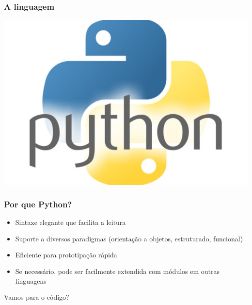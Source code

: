 \documentclass[aspectratio=169,14pt]{beamer}
\begin{document}
\begin{frame}
    \frametitle{A linguagem}
    \begin{center}
        \includegraphics[height=0.5\paperheight]{../images/pythonlogo.jpg}
    \end{center}
\end{frame}

\begin{frame}
    \frametitle{Por que Python?}
    \vfill
    \begin{itemize}
        \item Sintaxe elegante que facilita a leitura
        \item Suporte a diversos paradigmas (orientação a objetos,
        estruturado, funcional)
        \item Eficiente para prototipação rápida
        \item Se necessário, pode ser facilmente extendida com módulos
        em outras linguagens
    \end{itemize}
\end{frame}

\begin{frame}
    \vfill
    \begin{center}
        \huge Vamos para o código?
    \end{center}
\end{frame}
\end{document}
